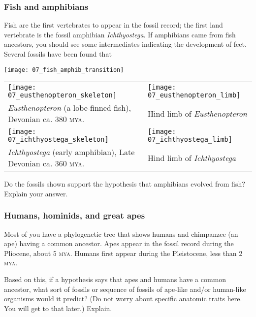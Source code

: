\documentclass[12pt, hidelinks]{exam}
\begin{document}
\begin{questions}
\newpage


\subsubsection*{Fish and amphibians}

Fish are the first vertebrates to appear in the fossil record; the first
land vertebrate is the fossil amphibian \emph{Ichthyostega}. If
amphibians came from fish ancestors, you should see some intermediates
indicating the development of feet. Several fossils have been found that

\texttt{[image: 07\_fish\_amphib\_transition]}

\begin{longtable}[c]{@{}L{0.48\textwidth}L{0.48\textwidth}@{}}
\toprule
\texttt{[image: 07\_eusthenopteron\_skeleton]} &
\texttt{[image: 07\_eusthenopteron\_limb]} \tabularnewline

\textit{Eusthenopteron} (a lobe-finned
fish), Devonian ca. 380 \textsc{mya}. &
Hind limb of \emph{Eusthenopteron}\tabularnewline
\midrule

\texttt{[image: 07\_ichthyostega\_skeleton]} &
\texttt{[image: 07\_ichthyostega\_limb]}\tabularnewline


\emph{Ichthyostega} (early amphibian), Late Devonian ca. 360 \textsc{mya}. &
Hind limb of \emph{Ichthyostega}\tabularnewline
\bottomrule
\end{longtable}

\question[3]
Do the fossils shown support the hypothesis that amphibians
evolved from fish? Explain your answer.



\newpage

\subsubsection*{Humans, hominids, and great apes}

Most of you have a phylogenetic tree that shows humans and chimpanzee (an ape)
having a common ancestor. Apes appear in the fossil record
during the Pliocene, about 5 \textsc{mya}. Humans first appear
during the Pleistocene, less than 2 \textsc{mya}. 

\question[2]
Based on this, if a hypothesis says that apes and
humans have a common ancestor, what sort of fossils or sequence of
fossils of ape-like and/or human-like organisms would it predict? (Do not
worry about specific anatomic traits here. You will get to that later.)
Explain.


\end{questions}
\end{document}
